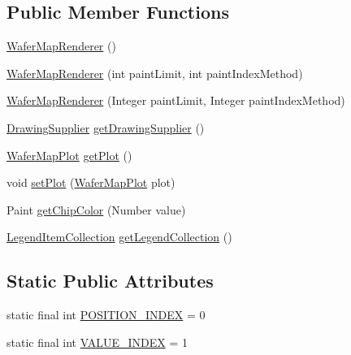 \subsection*{Public Member Functions}
\begin{DoxyCompactItemize}
\item 
\mbox{\hyperlink{classorg_1_1jfree_1_1chart_1_1renderer_1_1_wafer_map_renderer_ad940df66be082c73539cb94a492d61c9}{Wafer\+Map\+Renderer}} ()
\item 
\mbox{\hyperlink{classorg_1_1jfree_1_1chart_1_1renderer_1_1_wafer_map_renderer_adce334e5de764d0b5917d95989c8853d}{Wafer\+Map\+Renderer}} (int paint\+Limit, int paint\+Index\+Method)
\item 
\mbox{\hyperlink{classorg_1_1jfree_1_1chart_1_1renderer_1_1_wafer_map_renderer_aeee1bded04f2f41caa0d0b7ea14ef918}{Wafer\+Map\+Renderer}} (Integer paint\+Limit, Integer paint\+Index\+Method)
\item 
\mbox{\hyperlink{interfaceorg_1_1jfree_1_1chart_1_1plot_1_1_drawing_supplier}{Drawing\+Supplier}} \mbox{\hyperlink{classorg_1_1jfree_1_1chart_1_1renderer_1_1_wafer_map_renderer_a9b6b84d45df01aaa7aff3df105220590}{get\+Drawing\+Supplier}} ()
\item 
\mbox{\hyperlink{classorg_1_1jfree_1_1chart_1_1plot_1_1_wafer_map_plot}{Wafer\+Map\+Plot}} \mbox{\hyperlink{classorg_1_1jfree_1_1chart_1_1renderer_1_1_wafer_map_renderer_ae33e31575551c04a63d40c1add9a32dc}{get\+Plot}} ()
\item 
void \mbox{\hyperlink{classorg_1_1jfree_1_1chart_1_1renderer_1_1_wafer_map_renderer_a84afb08dedece5b7e0a6e8f7641005f1}{set\+Plot}} (\mbox{\hyperlink{classorg_1_1jfree_1_1chart_1_1plot_1_1_wafer_map_plot}{Wafer\+Map\+Plot}} plot)
\item 
Paint \mbox{\hyperlink{classorg_1_1jfree_1_1chart_1_1renderer_1_1_wafer_map_renderer_a01f01fe85a17e4632e0cada5f06e075f}{get\+Chip\+Color}} (Number value)
\item 
\mbox{\hyperlink{classorg_1_1jfree_1_1chart_1_1_legend_item_collection}{Legend\+Item\+Collection}} \mbox{\hyperlink{classorg_1_1jfree_1_1chart_1_1renderer_1_1_wafer_map_renderer_a086d98c9829e2e38af6c88732ae5b6e8}{get\+Legend\+Collection}} ()
\end{DoxyCompactItemize}
\subsection*{Static Public Attributes}
\begin{DoxyCompactItemize}
\item 
static final int \mbox{\hyperlink{classorg_1_1jfree_1_1chart_1_1renderer_1_1_wafer_map_renderer_a92b164da2ebaa32bd517e8faf7aedea1}{P\+O\+S\+I\+T\+I\+O\+N\+\_\+\+I\+N\+D\+EX}} = 0
\item 
static final int \mbox{\hyperlink{classorg_1_1jfree_1_1chart_1_1renderer_1_1_wafer_map_renderer_a8cdcb638e86d5a824af05ba009782593}{V\+A\+L\+U\+E\+\_\+\+I\+N\+D\+EX}} = 1
\end{DoxyCompactItemize}

